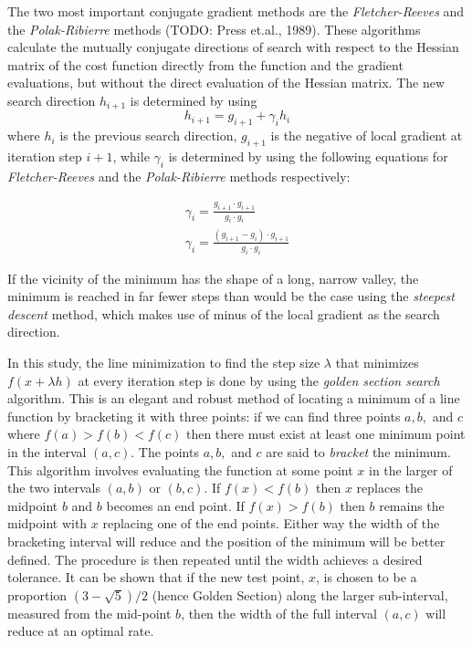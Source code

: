 The two most important conjugate gradient methods are the
\emph{Fletcher-Reeves} and the \emph{Polak-Ribierre} methods (TODO: Press
et.al., 1989). These algorithms calculate the mutually conjugate directions
of search with respect to the Hessian matrix of the cost function directly
from the function and the gradient evaluations, but without the direct
evaluation of the Hessian matrix. The new search direction $h_{i+1}$ is
determined by using
\begin{equation}
   h_{i+1} = g_{i+1}+\gamma_i h_i
\end{equation}
where $h_i$ is the previous search direction, $g_{i+1}$ is the negative of
local gradient at iteration step $i+1$, while $\gamma_i$ is determined by
using the following equations for \emph{Fletcher-Reeves} and the
\emph{Polak-Ribierre} methods respectively:

\begin{eqnarray}
   \gamma_i=\frac{g_{i+1} \cdot g_{i+1}}{g_{i} \cdot g_{i}} \\
   \gamma_i=\frac{(g_{i+1}-g_{i}) \cdot g_{i+1}}{g_{i} \cdot g_{i}}
\end{eqnarray}

If the vicinity of the minimum has the shape of a long, narrow valley, the
minimum is reached in far fewer steps than would be the case using the
\emph{steepest descent} method, which makes use of minus of the local
gradient as the search direction.

In this study, the line minimization to find the step size $\lambda$ that
minimizes $f(x+\lambda h)$ at every iteration step is done by using the
\emph{golden section search} algorithm. This is an elegant and robust
method of locating a minimum of a line function by bracketing it with three
points: if we can find three points $a,b,$ and $c$ where $f(a)>f(b)<f(c)$
then there must exist at least one minimum point in the interval $(a,c)$.
The points $a,b,$ and $c$ are said to \emph{bracket} the minimum. This
algorithm involves evaluating the function at some point $x$ in the larger
of the two intervals $(a,b)$ or $(b,c)$. If $f(x)<f(b)$ then $x$ replaces
the midpoint $b$ and $b$ becomes an end point. If $f(x)>f(b)$ then $b$
remains the midpoint with $x$ replacing one of the end points. Either way
the width of the bracketing interval will reduce and the position of the
minimum will be better defined. The procedure is then repeated until the
width achieves a desired tolerance. It can be shown that if the new test
point, $x$, is chosen to be a proportion $(3-\sqrt{5})/2$ (hence Golden
Section) along the larger sub-interval, measured from the mid-point $b$,
then the width of the full interval $(a,c)$ will reduce at an optimal rate.

